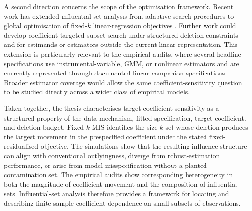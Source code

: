 \documentclass[../main.tex]{subfiles}
\begin{document}
A second direction concerns the scope of the optimisation framework. Recent work has extended influential-set analysis from adaptive search procedures to global optimisation of fixed-\(k\) linear-regression objectives \parencite{kuschnig2021hidden,konrad2026finding}. Further work could develop coefficient-targeted subset search under structured deletion constraints and for estimands or estimators outside the current linear representation. This extension is particularly relevant to the empirical audits, where several headline specifications use instrumental-variable, GMM, or nonlinear estimators and are currently represented through documented linear companion specifications. Broader estimator coverage would allow the same coefficient-sensitivity question to be studied directly across a wider class of empirical models.

Taken together, the thesis characterises target-coefficient sensitivity as a structured property of the data mechanism, fitted specification, target coefficient, and deletion budget. Fixed-\(k\) MIS identifies the size-\(k\) set whose deletion produces the largest movement in the prespecified coefficient under the stated fixed-residualised objective. The simulations show that the resulting influence structure can align with conventional outlyingness, diverge from robust-estimation performance, or arise from model misspecification without a planted contamination set. The empirical audits show corresponding heterogeneity in both the magnitude of coefficient movement and the composition of influential sets. Influential-set analysis therefore provides a framework for locating and describing finite-sample coefficient dependence on small subsets of observations.
\end{document}
